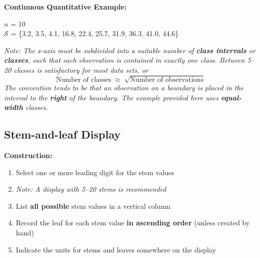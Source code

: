 \documentclass[12pt]{article}
\begin{document}
\noindent \textbf{Continuous Quantitative Example:}
\begin{flushleft}
    \(n\) = 10 \\
    $\mathcal{S}$ = \{3.2, 3.5, 4.1, 16.8, 22.4, 25.7, 31.9, 36.3, 41.0, 44.6\}
\end{flushleft}

\begin{flushleft}
\end{flushleft}
\textit{Note: The x-axis must be subdivided into a suitable number of \textbf{class intervals} or \textbf{classes}, such that each observation is contained in exactly one class. Between 5–20 classes is satisfactory for most data sets, or\[\text{Number of classes} \;\approx\; \sqrt{\text{Number of observations}}\] The convention tends to be that an observation on a boundary is placed in the interval to the \textbf{right} of the boundary. The example provided here uses \textbf{equal-width} classes.} \\



\subsection{Stem-and-leaf Display}
    \textbf{Construction:}
    \begin{enumerate} 
        \item Select one or more leading digit for the stem values
        \item[] \textit{Note: A display with 5–20 stems is recommended} 
        \item List \textbf{all possible} stem values in a vertical column 
        \item Record the leaf for each stem value \textbf{in ascending order} (unless created by hand) 
        \item Indicate the units for stems and leaves somewhere on the display 
    \end{enumerate}
\end{document}
